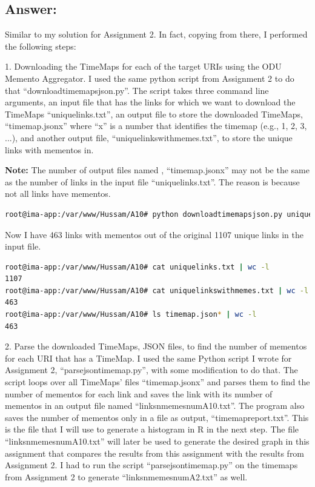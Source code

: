 \documentclass[a4paper, 11pt]{article}
\begin{document}
\subsection*{Answer:}

Similar to my solution for Assignment 2. In fact, copying from there, I performed the following steps:

1. Downloading the TimeMaps for each of the target URIs using the ODU 
Memento Aggregator. I used the same python script from Assignment 2 to do that ``downloadtimemapsjson.py''. The script takes three command line arguments, an input file that has the links for which we want to download the TimeMaps ``uniquelinks.txt'', an output file to store the downloaded TimeMaps, ``timemap.jsonx'' where ``x'' is a number that identifies the timemap (e.g., 1, 2, 3, ...), and another output file, ``uniquelinkswithmemes.txt'', to store the unique links with mementos in.

\textbf{Note:} The number of output files named , ``timemap.jsonx'' may not be the same as the number of links in the input file ``uniquelinks.txt''. The reason is because not all links have mementos.



\begin{lstlisting}[language=bash, breakatwhitespace=〈false), label=Command, caption=Running downloadtimemapsjson.py]
root@ima-app:/var/www/Hussam/A10# python downloadtimemapsjson.py uniquelinks.txt timemap.json uniquelinkswithmemes.txt
\end{lstlisting}

Now I have 463 links with mementos out of the original 1107 unique links in the input file.

\begin{lstlisting}[language=bash, breakatwhitespace=〈false), label=Command, caption=Links with mementos:]
root@ima-app:/var/www/Hussam/A10# cat uniquelinks.txt | wc -l
1107
root@ima-app:/var/www/Hussam/A10# cat uniquelinkswithmemes.txt | wc -l
463
root@ima-app:/var/www/Hussam/A10# ls timemap.json* | wc -l
463
\end{lstlisting}

2. Parse the downloaded TimeMaps, JSON files, to find the number of mementos for each URI that has a TimeMap. I used the same Python script I wrote for Assignment 2, ``parsejsontimemap.py'', with some modification to do that. The script loops over all TimeMaps' files ``timemap.jsonx'' and parses them to find the number of mementos for each link and saves the link with its number of mementos in an output file named ``linksnmemesnumA10.txt''. The program also saves the number of mementos only in a file as output, ``timemapreport.txt''. This is the file that I will use to generate a histogram in R in the next step. The file ``linksnmemesnumA10.txt'' will later be used to generate the desired graph in this assignment that compares the results from this assignment with the results from Assignment 2. I had to run the script ``parsejsontimemap.py'' on the timemaps from Assignment 2 to generate ``linksnmemesnumA2.txt'' as well.
\end{document}

